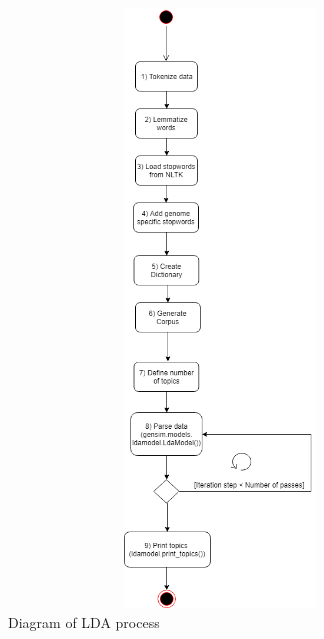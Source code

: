 \begin{figure}[htbp]
	\centering
	\includegraphics[width=1\textwidth, height=600px, keepaspectratio]{Image/LDA_central_process.png}
	\caption{Diagram of LDA process}
	\label{LDA_central_process_figure}
\end{figure}

